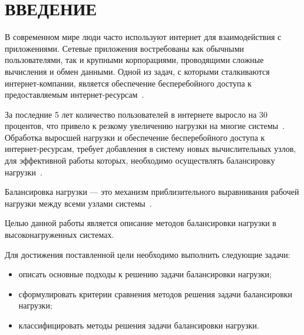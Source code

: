 \chapter*{ВВЕДЕНИЕ}

В современном мире люди часто используют интернет для взаимодействия с приложениями.
Сетевые приложения востребованы как обычными пользователями, так и крупными корпорациями, проводящими сложные вычисления и обмен данными.
Одной из задач, с которыми сталкиваются интернет-компании, является обеспечение бесперебойного доступа к предоставляемым интернет-ресурсам~\cite{webact}.

За последние 5 лет количество пользователей в интернете выросло на 30 процентов, что привело к резкому увеличению нагрузки на многие системы~\cite{statistics}.
Обработка выросшей нагрузки и обеспечение бесперебойного доступа к интернет-ресурсам, требует добавления в систему новых вычислительных узлов, для эффективной работы которых, необходимо осуществлять балансировку нагрузки~\cite{strategies, com_analysis, gaud, part_algos}.


Балансировка нагрузки --- это механизм приблизительного выравнивания рабочей нагрузки между всеми узлами системы~\cite{anal, gaud}.

Целью данной работы является описание методов балансировки нагрузки в высоконагруженных системах.

Для достижения поставленной цели необходимо выполнить следующие задачи:
\begin{itemize}
	\item описать основные подходы к решению задачи балансировки нагрузки;
	\item сформулировать критерии сравнения методов решения задачи балансировки нагрузки;
	\item классифицировать методы решения задачи балансировки нагрузки.
\end{itemize}

